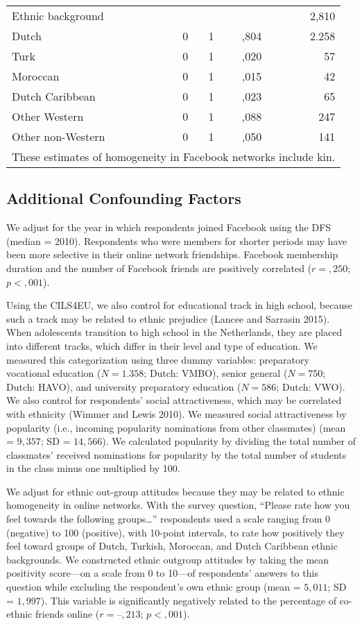 \documentclass[letterpaper]{article} %
\begin{document}
\begin{table}[H]
\begin{tabular}{lrrrrr}
Ethnic background & & & & & 2,810\\
Dutch  & 0 & 1 & ,804 & & 2.258\\
Turk  & 0  & 1 & ,020 & &  57\\
Moroccan & 0 & 1 & ,015 & & 42\\
Dutch Caribbean & 0 & 1 & ,023 & & 65\\
Other Western  & 0  & 1 & ,088 & & 247\\
Other non-Western & 0 & 1 & ,050 & & 141\\
\hline
\multicolumn{6}{l}{{\scriptsize *These estimates of homogeneity in Facebook networks include kin.}}
\end{tabular}
\end{table}

\subsection{Additional Confounding Factors}
We adjust for the year in which respondents joined Facebook using the DFS (median = 2010). Respondents who were members for shorter periods may have been more selective in their online network friendships. Facebook membership duration and the number of Facebook friends are positively correlated ($r = ,250$; $p < ,001$).

Using the CILS4EU, we also control for educational track in high school, because such a track may be related to ethnic prejudice (Lancee and Sarrasin 2015). When adolescents transition to high school in the Netherlands, they are placed into different tracks, which differ in their level and type of education. We measured this categorization using three dummy variables: preparatory vocational education ($N = 1.358$; Dutch: VMBO), senior general ($N = 750$; Dutch: HAVO), and university preparatory education ($N = 586$; Dutch: VWO). We also control for respondents’ social attractiveness, which may be correlated with ethnicity (Wimmer and Lewis 2010). We measured social attractiveness by popularity (i.e., incoming popularity nominations from other classmates) (mean = $9,357$; SD = $14,566$). We calculated popularity by dividing the total number of classmates’ received nominations for popularity by the total number of students in the class minus one multiplied by 100.

We adjust for ethnic out-group attitudes because they may be related to ethnic homogeneity in online networks. With the survey question, ``Please rate how you feel towards the following groups\ldots'' respondents used a scale ranging from 0 (negative) to 100 (positive), with 10-point intervals, to rate how positively they feel toward groups of Dutch, Turkish, Moroccan, and Dutch Caribbean ethnic backgrounds. We constructed ethnic outgroup attitudes by taking the mean positivity score—on a scale from 0 to 10—of respondents’ answers to this question while excluding the respondent’s own ethnic group (mean = $5,011$; SD = $1,997$). This variable is significantly negatively related to the percentage of co-ethnic friends online ($r = –,213$; $p < ,001$). 
\end{document}
